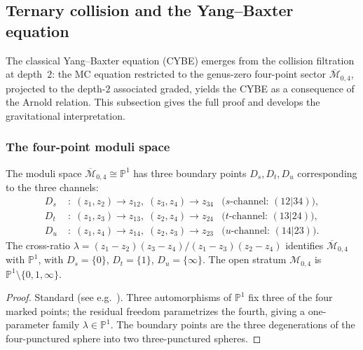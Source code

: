 %
%

\subsection{Ternary collision and the Yang--Baxter equation}
\label{subsec:thqg-V-ternary-collision}

The classical Yang--Baxter equation (CYBE) emerges from the
collision filtration at depth~$2$: the MC equation restricted to
the genus-zero four-point sector $\overline{\mathcal{M}}_{0,4}$,
projected to the depth-$2$ associated graded, yields the CYBE
as a consequence of the Arnold relation. This subsection gives
the full proof and develops the gravitational interpretation.


\subsubsection{The four-point moduli space}

\begin{lemma}
\label{lem:thqg-V-m04-structure}
The moduli space $\overline{\mathcal{M}}_{0,4} \cong \mathbb{P}^1$
has three boundary points
$D_s, D_t, D_u$ corresponding to the three channels:
\begin{align}
D_s &\;:\; (z_1, z_2) \to z_{12},\;(z_3, z_4) \to z_{34}
 & \text{($s$-channel: $(12|34)$)},
 \label{eq:thqg-V-s-channel} \\
D_t &\;:\; (z_1, z_3) \to z_{13},\;(z_2, z_4) \to z_{24}
 & \text{($t$-channel: $(13|24)$)},
 \label{eq:thqg-V-t-channel} \\
D_u &\;:\; (z_1, z_4) \to z_{14},\;(z_2, z_3) \to z_{23}
 & \text{($u$-channel: $(14|23)$)}.
 \label{eq:thqg-V-u-channel}
\end{align}
The cross-ratio $\lambda = (z_1 - z_2)(z_3 - z_4)/
(z_1 - z_3)(z_2 - z_4)$ identifies $\overline{\mathcal{M}}_{0,4}$
with $\mathbb{P}^1$, with $D_s = \{0\}$, $D_t = \{1\}$,
$D_u = \{\infty\}$. The open stratum $\mathcal{M}_{0,4}$
is $\mathbb{P}^1 \setminus \{0,1,\infty\}$.
\end{lemma}

\begin{proof}
Standard (see e.g.~\cite{Kn83}). Three automorphisms of
$\mathbb{P}^1$ fix three of the four marked points; the residual
freedom parametrizes the fourth, giving a one-parameter family
$\lambda \in \mathbb{P}^1$. The boundary points are the three
degenerations of the four-punctured sphere into two three-punctured
spheres.
\end{proof}

